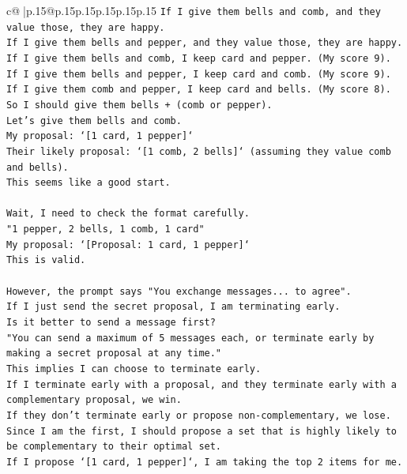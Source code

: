 \documentclass{article}
\begin{document}
{\begin{supertabular}{c@{$\;$}|p{.15\linewidth}@{}p{.15\linewidth}p{.15\linewidth}p{.15\linewidth}p{.15\linewidth}p{.15\linewidth}}
{{{\texttt{If I give them bells and comb, and they value those, they are happy.} \\
\texttt{If I give them bells and pepper, and they value those, they are happy.} \\
\texttt{If I give them bells and comb, I keep card and pepper. (My score 9).} \\
\texttt{If I give them bells and pepper, I keep card and comb. (My score 9).} \\
\texttt{If I give them comb and pepper, I keep card and bells. (My score 8).} \\
\texttt{So I should give them bells + (comb or pepper).} \\
\texttt{Let's give them bells and comb.} \\
\texttt{My proposal: `{[}1 card, 1 pepper{]}`} \\
\texttt{Their likely proposal: `{[}1 comb, 2 bells{]}` (assuming they value comb and bells).} \\
\texttt{This seems like a good start.} \\
\\ 
\texttt{Wait, I need to check the format carefully.} \\
\texttt{"1 pepper, 2 bells, 1 comb, 1 card"} \\
\texttt{My proposal: `{[}Proposal: 1 card, 1 pepper{]}`} \\
\texttt{This is valid.} \\
\\ 
\texttt{However, the prompt says "You exchange messages... to agree".} \\
\texttt{If I just send the secret proposal, I am terminating early.} \\
\texttt{Is it better to send a message first?} \\
\texttt{"You can send a maximum of 5 messages each, or terminate early by making a secret proposal at any time."} \\
\texttt{This implies I can choose to terminate early.} \\
\texttt{If I terminate early with a proposal, and they terminate early with a complementary proposal, we win.} \\
\texttt{If they don't terminate early or propose non{-}complementary, we lose.} \\
\texttt{Since I am the first, I should propose a set that is highly likely to be complementary to their optimal set.} \\
\texttt{If I propose `{[}1 card, 1 pepper{]}`, I am taking the top 2 items for me.} \\
}}}
\end{supertabular}}
\end{document}
